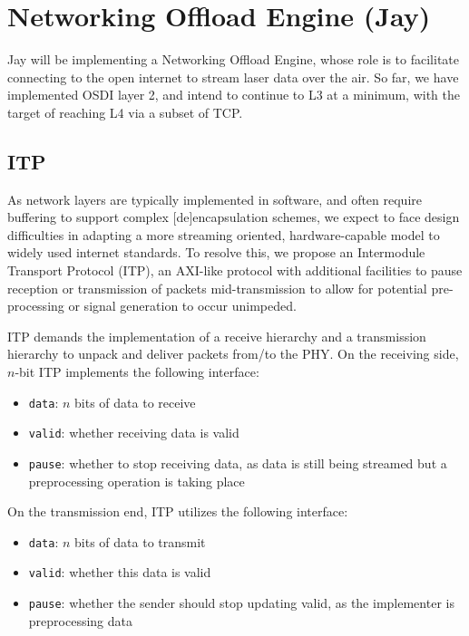 \documentclass[11pt]{article}
\begin{document}
\section{Networking Offload Engine (Jay)}

Jay will be implementing a Networking Offload Engine, whose role is to facilitate connecting to the open internet to stream laser data over the air. So far, we have implemented OSDI layer 2, and intend to continue to L3 at a minimum, with the target of reaching L4 via a subset of TCP.

\subsection{ITP}
As network layers are typically implemented in software, and often require buffering to support complex [de]encapsulation schemes, we expect to face design difficulties in adapting a more streaming oriented, hardware-capable model to widely used internet standards. To resolve this, we propose an Intermodule Transport Protocol (ITP), an AXI-like protocol with additional facilities to pause reception or transmission of packets mid-transmission to allow for potential pre-processing or signal generation to occur unimpeded.\newline

\noindent ITP demands the implementation of a receive hierarchy and a transmission hierarchy to unpack and deliver packets from/to the PHY. On the receiving side, $n$-bit ITP implements the following interface:
\begin{itemize}
    \item \texttt{data}: $n$ bits of data to receive
    \item \texttt{valid}: whether receiving data is valid
    \item \texttt{pause}: whether to stop receiving data, as data is still being streamed but a preprocessing operation is taking place
\end{itemize}

On the transmission end, ITP utilizes the following interface:
\begin{itemize}
    \item \texttt{data}: $n$ bits of data to transmit
    \item \texttt{valid}: whether this data is valid
    \item \texttt{pause}: whether the sender should stop updating valid, as the implementer is preprocessing data
\end{itemize}
\end{document}
